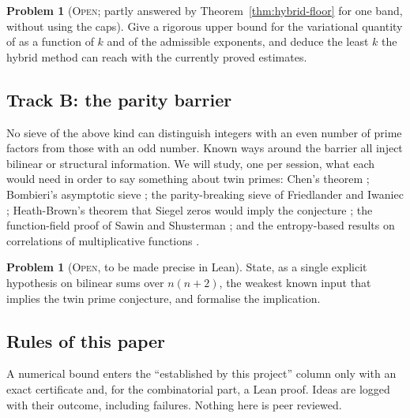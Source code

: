 \documentclass[11pt]{amsart}
\theoremstyle{definition}
\newtheorem{problem}[theorem]{Problem}
\theoremstyle{remark}
\newcommand{\lbl}[1]{\textup{\textsc{#1}}}
\begin{document}
\begin{problem}[\lbl{Open}; partly answered by Theorem~\ref{thm:hybrid-floor} for one band, without using the caps]
Give a rigorous upper bound for the variational quantity of \cite{Sta26} as a
function of $k$ and of the admissible exponents, and deduce the least $k$ the
hybrid method can reach with the currently proved estimates.
\end{problem}

\subsection*{Track B: the parity barrier}
No sieve of the above kind can distinguish integers with an even number of
prime factors from those with an odd number. Known ways around the barrier
all inject bilinear or structural information. We will study, one per
session, what each would need in order to say something about twin primes:
Chen's theorem \cite{Che73}; Bombieri's asymptotic sieve \cite{Bom76}; the
parity-breaking sieve of Friedlander and Iwaniec \cite{FI98}; Heath-Brown's
theorem that Siegel zeros would imply the conjecture \cite{HB83}; the
function-field proof of Sawin and Shusterman \cite{SS22}; and the
entropy-based results on correlations of multiplicative functions
\cite{Tao16}.

\begin{problem}[\lbl{Open}, to be made precise in Lean]
State, as a single explicit hypothesis on bilinear sums over $n(n+2)$, the
weakest known input that implies the twin prime conjecture, and formalise the
implication.
\end{problem}

\subsection*{Rules of this paper}
A numerical bound enters the ``established by this project'' column only with
an exact certificate and, for the combinatorial part, a Lean proof. Ideas are
logged with their outcome, including failures. Nothing here is peer reviewed.
\end{document}
